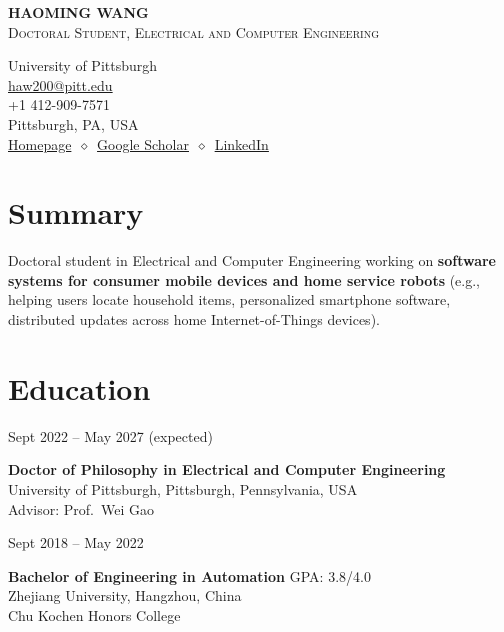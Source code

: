 \documentclass[11pt, letterpaper]{article}
\newenvironment{datedentry}[1]{%
  \par\noindent
  \begin{minipage}[t]{2.8cm}\raggedright\small #1\end{minipage}%
  \hspace{0.3cm}%
  \begin{minipage}[t]{\dimexpr\linewidth-3.1cm\relax}\raggedright
}{\end{minipage}\par\medskip}
\begin{document}
\noindent
\begin{minipage}[t]{0.58\linewidth}
  \vspace{0pt}
  {\fontsize{24pt}{26pt}\selectfont \textbf{HAOMING WANG}}\\[2pt]
  {\scshape\normalsize Doctoral Student, Electrical and Computer Engineering}
\end{minipage}%
\begin{minipage}[t]{0.42\linewidth}
  \vspace{0pt}
  \raggedleft\small
  University of Pittsburgh \\
  \href{mailto:haw200@pitt.edu}{haw200@pitt.edu} \\
  +1 412-909-7571 \\
  Pittsburgh, PA, USA \\[2pt]
  \href{https://haomingwang645.github.io/}{Homepage}\ $\diamond$\ \href{https://scholar.google.com.hk/citations?user=bf6LCjUAAAAJ}{Google Scholar}\ $\diamond$\ \href{https://www.linkedin.com/in/haoming-wang-40a6a7239/}{LinkedIn}
\end{minipage}

\section{Summary}
Doctoral student in Electrical and Computer Engineering working on \textbf{software systems for consumer mobile devices and home service robots} (e.g., helping users locate household items, personalized smartphone software, distributed updates across home Internet-of-Things devices).

\section{Education}

\begin{datedentry}{Sept 2022 -- May 2027 (expected)}
\textbf{Doctor of Philosophy in Electrical and Computer Engineering}\\
University of Pittsburgh, Pittsburgh, Pennsylvania, USA\\
Advisor: Prof.\ Wei Gao
\end{datedentry}

\begin{datedentry}{Sept 2018 -- May 2022}
\textbf{Bachelor of Engineering in Automation} \hfill GPA: 3.8/4.0\\
Zhejiang University, Hangzhou, China\\
Chu Kochen Honors College
\end{datedentry}
\end{document}
